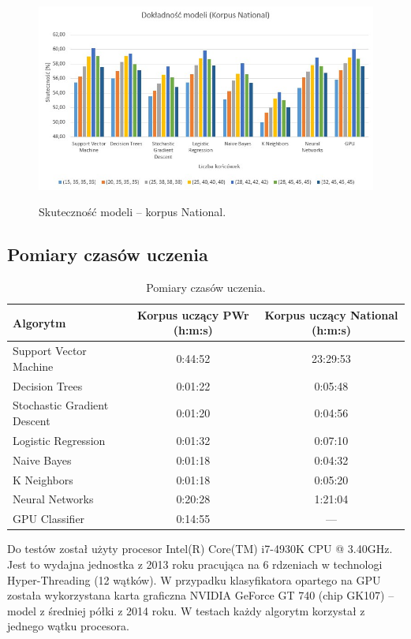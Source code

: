 \begin{figure}[H]
	\centering
	\includegraphics[width=\linewidth]{charts/korpusnationalwykres}
	\label{Rysunek}
	\caption{Skuteczność modeli -- korpus National.}
\end{figure}

\newpage
\subsection{Pomiary czasów uczenia}

\begin{table}[H]
	\centering
	\caption{Pomiary czasów uczenia.}
	\smallskip
	\begin{tabular}{lcc}
		\toprule
		\textbf{Algorytm} & \textbf{Korpus uczący PWr (h:m:s)} &  \textbf{Korpus uczący National (h:m:s)} \\
		\midrule
		Support Vector Machine & 0:44:52 & 23:29:53 \\
		Decision Trees & 0:01:22 & 0:05:48 \\
		Stochastic Gradient Descent & 0:01:20 & 0:04:56 \\
		Logistic Regression & 0:01:32 & 0:07:10 \\
		Naive Bayes & 0:01:18 & 0:04:32 \\
		K Neighbors & 0:01:18 & 0:05:20 \\
		Neural Networks & 0:20:28 & 1:21:04 \\
		GPU Classifier & 0:14:55 & --- \\
		\bottomrule
	\end{tabular}
\end{table}
Do testów został użyty procesor Intel(R) Core(TM) i7-4930K CPU @ 3.40GHz. Jest to wydajna jednostka z 2013 roku pracująca na 6 rdzeniach w technologi Hyper-Threading (12 wątków).
W przypadku klasyfikatora opartego na GPU została wykorzystana karta graficzna NVIDIA GeForce GT 740 (chip GK107) -- model z średniej półki z 2014 roku.
W testach każdy algorytm korzystał z jednego wątku procesora.

